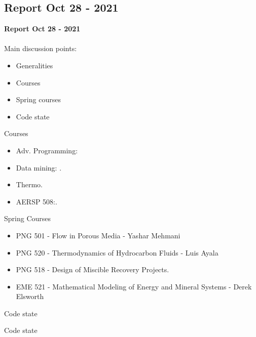 \documentclass{beamer}
\begin{document}
	

	\subsection{Report Oct 28 - 2021}
	\justifying
	\begin{frame}
		\textbf{Report Oct 28 - 2021}\\~\\
		Main discussion points:
		\begin{itemize}
			\item Generalities
			\item Courses
			\item Spring courses
			\item Code state
		\end{itemize}
	\end{frame}
	
	\begin{frame}{Courses}
		\begin{itemize}
			\item Adv. Programming:
			\item Data mining: .
			\item Thermo.
			\item AERSP 508:.
		\end{itemize}
	\end{frame}

	\begin{frame}{Spring Courses}
		\begin{itemize}
			\item PNG 501 - Flow in Porous Media - Yashar Mehmani
			\item PNG 520 - Thermodynamics of Hydrocarbon Fluids - Luis Ayala
			\item PNG 518 - Design of Miscible Recovery Projects.
			\item EME 521 - Mathematical Modeling of Energy and Mineral Systems - Derek Elsworth
		\end{itemize}
	\end{frame}

	\begin{frame}{Code state}
	\end{frame}
	
	\begin{frame}{Code state}

	\end{frame}
\end{document}
